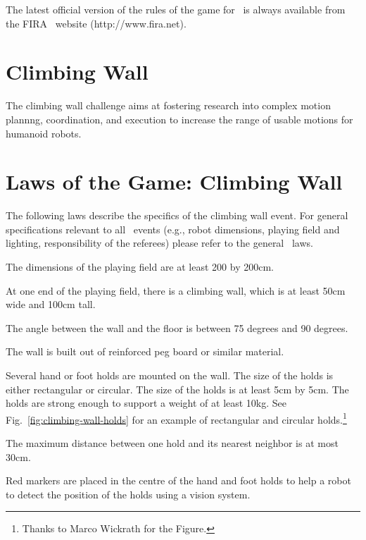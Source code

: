 \documentclass[12pt]{hurocup}
\begin{document}
The latest official version of the rules of the game for \HuroCup\ is
always available from the FIRA \HuroCup\ website (http://www.fira.net).

\newpage

\section{Climbing Wall}
\label{sec:climbing-wall}

The climbing wall challenge aims at fostering research into complex
motion plannng, coordination, and execution to increase the range of
usable motions for humanoid robots.

\section{Laws of the Game: Climbing Wall}
\label{sec:laws-climbing-wall}

The following laws describe the specifics of the climbing wall
event. For general specifications relevant to all \HuroCup\ events
(e.g., robot dimensions, playing field and lighting, responsibility of
the referees) please refer to the general \HuroCup\ laws.

\label{law:field-of-play}

\begin{lawlist}[CW]

\item The dimensions of the playing field are at least 200 by
  200cm. 

\item At one end of the playing field, there is a climbing wall, which
  is at least 50cm wide and 100cm tall. 

\item The angle between the wall and the floor is between 75 degrees
  and 90 degrees.
  
\item The wall is built out of reinforced peg board or similar
  material. 

\item Several hand or foot holds are mounted on the wall. The size of
  the holds is either rectangular or circular. The size of the holds
  is at least 5cm by 5cm. The holds are strong enough to support a
  weight of at least 10kg. See Fig.~\ref{fig:climbing-wall-holds} for
  an example of rectangular and circular holds.\footnote{Thanks to
    Marco Wickrath for the Figure.}

\item The maximum distance between one hold and its nearest neighbor
  is at most 30cm.

\item Red markers are placed in the centre of the hand and foot holds
  to help a robot to detect the position of the holds using a vision
  system.

\end{lawlist}
\end{document}
